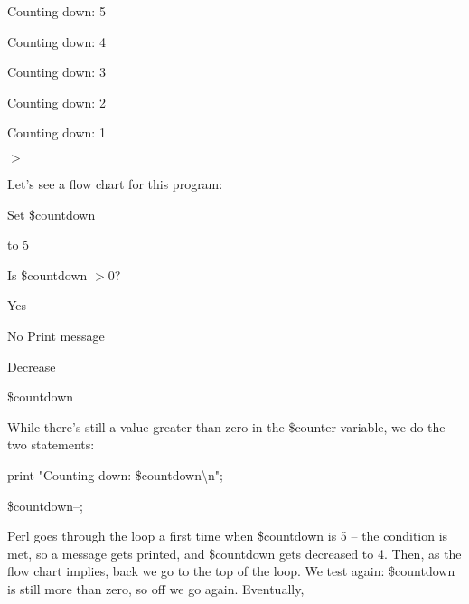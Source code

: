 \documentclass[a4paper,11pt]{book}
\begin{document}
\noindent Counting down: 5

\noindent Counting down: 4

\noindent Counting down: 3

\noindent Counting down: 2

\noindent Counting down: 1

\noindent $>$

\noindent 

\noindent 

\noindent Let's see a flow chart for this program:

\noindent 

\noindent 

\noindent 

\noindent 

\noindent 

\noindent Set \$countdown

\noindent to 5

\noindent 

\noindent 

\noindent 

\noindent 

\noindent 

\noindent Is \$countdown $>$0?

\noindent 

\noindent 

\noindent Yes

\noindent 

\noindent 

\noindent No Print message

\noindent 

\noindent 

\noindent 

\noindent 

\noindent Decrease

\noindent \$countdown

\noindent 

\noindent 

\noindent 

\noindent While there's still a value greater than zero in the \$counter variable, we do the two statements:

\noindent 

\noindent print "Counting down: \$countdown\textbackslash n";

\noindent \$countdown--;

\noindent 

\noindent Perl goes through the loop a first time when \$countdown is 5 -- the condition is met, so a message gets printed, and \$countdown gets decreased to 4. Then, as the flow chart implies, back we go to the top of the   loop.   We   test   again:   \$countdown is   still   more   than   zero,   so   off   we   go   again.   Eventually,
\end{document}
